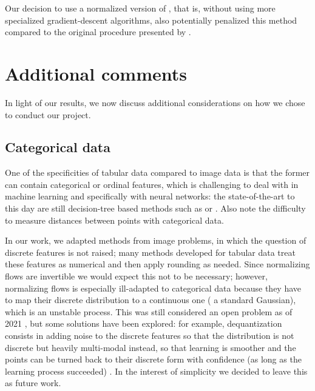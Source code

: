 \documentclass[../main.tex]{subfiles}
\begin{document}
Our decision to use a normalized version of \revise{}, that is, without using more specialized gradient-descent algorithms,
also potentially penalized this method compared to the original procedure presented by \citeauthor{joshiRealistic2019} \cite{joshiRealistic2019}.


\section{Additional comments}

In light of our results, we now discuss additional considerations on how we chose to conduct our project.

\subsection{Categorical data}

One of the specificities of tabular data compared to image data is that the former can contain categorical or ordinal features, which is challenging to deal with in machine learning and specifically with neural networks: the state-of-the-art to this day are still decision-tree based methods such as  \cite{chenXGBoost2016} or  \cite{prokhorenkovaCatBoost2018}.
Also note the difficulty to measure distances between points with categorical data.

In our work, we adapted methods from image problems, in which the question of discrete features is not raised; many methods developed for tabular data treat these features as numerical and then apply rounding as needed.
Since normalizing flows are invertible we would expect this not to be necessary; however, normalizing flows is especially ill-adapted to categorical data because they have to map their discrete distribution to a continuous one (\eg{} a standard Gaussian), which is an unstable process.
This was still considered an open problem as of 2021 \cite{kobyzevNormalizing2021}, but some solutions have been explored:
for example, dequantization consists in adding noise to the discrete features so that the distribution is not discrete but heavily multi-modal instead, so that learning is smoother and the points can be turned back to their discrete form with confidence (as long as the learning process succeeded) \cite{hoFlow2019}.
In the interest of simplicity we decided to leave this as future work.

\subsection{\CakeOnSea}
\end{document}
